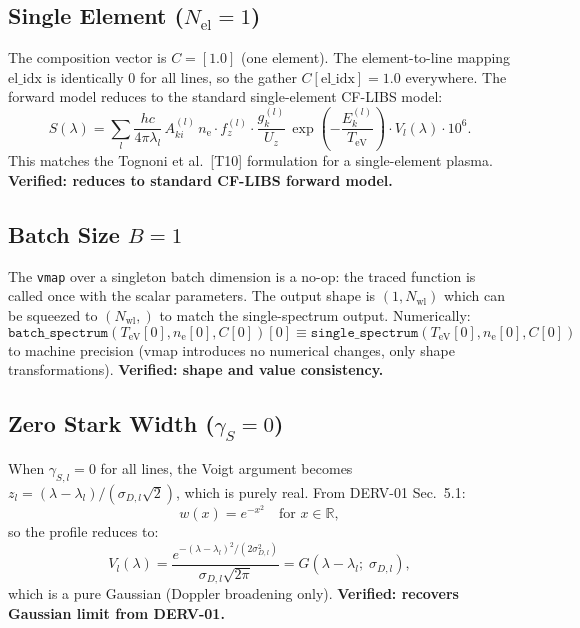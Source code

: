 \documentclass[11pt]{article}
\newcommand{\TeV}{T_\mathrm{eV}}
\newcommand{\ne}{n_\mathrm{e}}
\newcommand{\wfn}{w}
\begin{document}
\subsection{Single Element ($N_\mathrm{el} = 1$)}

The composition vector is $C = [1.0]$ (one element). The element-to-line
mapping $\mathrm{el\_idx}$ is identically 0 for all lines, so the
gather $C[\mathrm{el\_idx}] = 1.0$ everywhere. The forward model reduces
to the standard single-element CF-LIBS model:
\begin{equation}
  S(\lambda) = \sum_l \frac{hc}{4\pi\lambda_l}\,A_{ki}^{(l)}\,
    \ne \cdot f_z^{(l)} \cdot \frac{g_k^{(l)}}{U_z}\,
    \exp\!\left(-\frac{E_k^{(l)}}{\TeV}\right)
    \cdot V_l(\lambda) \cdot 10^6.
\end{equation}
This matches the Tognoni et al.\ [T10] formulation for a single-element
plasma. \textbf{Verified: reduces to standard CF-LIBS forward model.}

\subsection{Batch Size $B = 1$}

The \texttt{vmap} over a singleton batch dimension is a no-op: the traced
function is called once with the scalar parameters. The output shape is
$(1, N_\mathrm{wl})$ which can be squeezed to $(N_\mathrm{wl},)$ to match
the single-spectrum output. Numerically:
\begin{equation}
  \texttt{batch\_spectrum}(\TeV[0], \ne[0], C[0])[0]
  \equiv \texttt{single\_spectrum}(\TeV[0], \ne[0], C[0])
\end{equation}
to machine precision (vmap introduces no numerical changes, only
shape transformations). \textbf{Verified: shape and value consistency.}

\subsection{Zero Stark Width ($\gamma_S = 0$)}

When $\gamma_{S,l} = 0$ for all lines, the Voigt argument becomes
$z_l = (\lambda - \lambda_l)/(\sigma_{D,l}\sqrt{2})$, which is
purely real. From DERV-01 Sec.~5.1:
\begin{equation}
  \wfn(x) = e^{-x^2} \quad \text{for } x \in \mathbb{R},
\end{equation}
so the profile reduces to:
\begin{equation}
  V_l(\lambda) = \frac{e^{-(\lambda-\lambda_l)^2/(2\sigma_{D,l}^2)}}{\sigma_{D,l}\sqrt{2\pi}}
  = G(\lambda - \lambda_l;\;\sigma_{D,l}),
\end{equation}
which is a pure Gaussian (Doppler broadening only).
\textbf{Verified: recovers Gaussian limit from DERV-01.}
\end{document}
